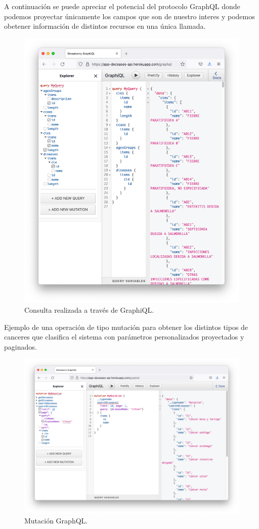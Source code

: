 A continuación se puede apreciar el potencial del protocolo GraphQL donde podemos
proyectar únicamente los campos que son de nuestro interes y podemos obetener información
de distintos recursos en una única llamada.
\FloatBarrier
\begin{figure}[h]
	\centering
	\includegraphics[width=\textwidth]{doc/logos/imgs/ejemplo3.png}
	\caption{ Consulta realizada a través de GraphiQL. }
\end{figure}
\FloatBarrier

Ejemplo de una operación de tipo mutación para obtener los distintos tipos de canceres que
clasifica el sistema con parámetros personalizados proyectados y paginados.
\FloatBarrier
\begin{figure}[h]
	\centering
	\includegraphics[width=\textwidth]{doc/logos/imgs/ejemplo4.png}
	\caption{ Mutación GraphQL. }
\end{figure}
\FloatBarrier

